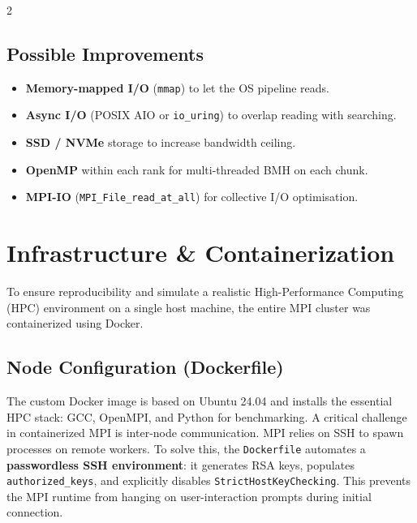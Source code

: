 \documentclass[11pt,a4paper]{article}
\begin{document}
\begin{multicols}{2}
\subsection{Possible Improvements}

\begin{itemize}[nosep,leftmargin=*,label=\textcolor{accent}{$\triangleright$}]
  \item \textbf{Memory-mapped I/O} (\texttt{mmap}) to let the OS pipeline reads.
  \item \textbf{Async I/O} (POSIX AIO or \texttt{io\_uring}) to overlap reading with searching.
  \item \textbf{SSD / NVMe} storage to increase bandwidth ceiling.
  \item \textbf{OpenMP} within each rank for multi-threaded BMH on each chunk.
  \item \textbf{MPI-IO} (\texttt{MPI\_File\_read\_at\_all}) for collective I/O optimisation.
\end{itemize}

\end{multicols}

\vspace{0.4cm}


\section{Infrastructure \& Containerization}

To ensure reproducibility and simulate a realistic High-Performance Computing (HPC) environment on a single host machine, the entire MPI cluster was containerized using Docker. 

\subsection{Node Configuration (Dockerfile)}
The custom Docker image is based on Ubuntu 24.04 and installs the essential HPC stack: GCC, OpenMPI, and Python for benchmarking. A critical challenge in containerized MPI is inter-node communication. MPI relies on SSH to spawn processes on remote workers. To solve this, the \texttt{Dockerfile} automates a \textbf{passwordless SSH environment}: it generates RSA keys, populates \texttt{authorized\_keys}, and explicitly disables \texttt{StrictHostKeyChecking}. This prevents the MPI runtime from hanging on user-interaction prompts during initial connection.
\end{document}
